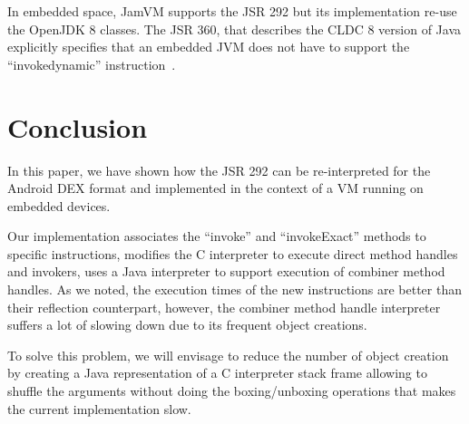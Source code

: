 \documentclass{sig-alternate}
\def \Jsr{JSR\xspace}
\def \JSR{\Jsr 292\xspace}
\def \ANDROID{Android\xspace}
\begin{document}
  In embedded space, JamVM supports the \JSR but its implementation re-use the OpenJDK 8 classes.
  The \Jsr 360, that describes the CLDC 8 version of Java explicitly specifies that
  an embedded JVM does not have to support the  ``invokedynamic'' instruction~\cite{jcp-jsr-360}.
  
\section{Conclusion}
  In this paper, we have shown how the \JSR can be re-interpreted for the \ANDROID DEX format and
  implemented in the context of a VM running on embedded devices.

  Our implementation associates the ``invoke'' and ``invokeExact'' methods to specific instructions,
  modifies the C interpreter to execute direct method handles and invokers, uses a Java interpreter to support execution of combiner method handles.
  As we noted, the execution times of the new instructions are better than their reflection counterpart,
  however, the combiner method handle interpreter suffers a lot of slowing down due to its frequent object creations.

  To solve this problem, we will envisage to reduce the number of object creation by creating a Java representation of
  a C interpreter stack frame allowing to shuffle the arguments without doing the boxing/unboxing operations that
  makes the current implementation slow.

\appendix


\makeatletter
  \def\@seccntformat#1{Appendix~\csname the#1\endcsname:\quad}
\makeatother

% 

\end{document}
